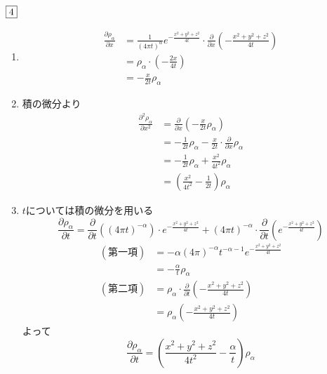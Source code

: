 \documentclass[dvipdfmx]{jsreport}
\begin{document}
\begin{souanswer} %
	$\fbox{4}$
\begin{enumerate}
	\item 
\begin{align*}
	\frac{\partial \rho_\alpha}{\partial x}
	&= \frac{1}{(4\pi t)^\alpha}e^{-\frac{x^2+ y^2+ z^2}{4t}}\cdot \frac{\partial}{\partial x}\left(-\frac{x^2+ y^2+ z^2}{4t}\right)\\
	&= \rho_\alpha\cdot\left(-\frac{2x}{4t}\right)\\
	&= -\frac{x}{2t}\rho_\alpha
\end{align*}

	\item 積の微分より
\begin{align*}
	\frac{\partial^2 \rho_\alpha}{\partial x^2}
	&= \frac{\partial}{\partial x}\left(-\frac{x}{2t}\rho_\alpha\right)\\
	&= -\frac{1}{2t}\rho_\alpha- \frac{x}{2t}\cdot \frac{\partial}{\partial x}\rho_\alpha\\
	&= -\frac{1}{2t}\rho_\alpha+ \frac{x^2}{4t^2}\rho_\alpha\\
	&= \left(\frac{x^2}{4t^2}- \frac{1}{2t}\right)\rho_\alpha
\end{align*}

	\item $t$については積の微分を用いる
\begin{equation*}
	\frac{\partial \rho_\alpha}{\partial t}
	= \frac{\partial}{\partial t}((4\pi t)^{-\alpha})\cdot e^{-\frac{x^2+ y^2+ z^2}{4t}}+ (4\pi t)^{-\alpha}\cdot \frac{\partial}{\partial t}\left(e^{-\frac{x^2+ y^2+ z^2}{4t}}\right)
\end{equation*}
\begin{align*}
	(第一項)
	&= -\alpha(4\pi)^{-\alpha}t^{-\alpha- 1}e^{-\frac{x^2+ y^2+ z^2}{4t}}\\
	&= -\frac{\alpha}{t}\rho_\alpha\\
	(第二項)
	&= \rho_\alpha\cdot \frac{\partial}{\partial t}\left({-\frac{x^2+ y^2+ z^2}{4t}}\right)\\
	&= \rho_\alpha\left({-\frac{x^2+ y^2+ z^2}{4t}}\right)
\end{align*}
	よって
\begin{equation*}
	\frac{\partial \rho_\alpha}{\partial t}= \left(\frac{x^2+ y^2+ z^2}{4t^2}- \frac{\alpha}{t}\right)\rho_\alpha
\end{equation*}


\end{enumerate}
\end{souanswer}
\end{document}
